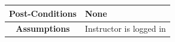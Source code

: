 \documentclass{scrreprt}
\begin{document}
\begin{table}[H]
\begin{tabular}{|c|l|}
\textbf{Post-Conditions}      & None                                                                                                                                                                                                                                                                                    \\ \hline
\textbf{Assumptions}          & Instructor is logged in                                                                                                                                                                                                                                                                 \\ \hline
\end{tabular}
\end{table}
\end{document}
